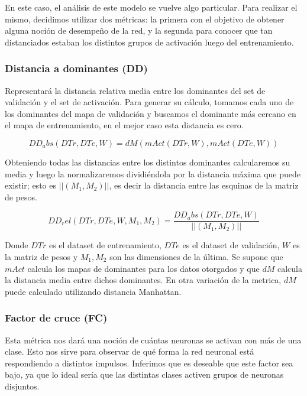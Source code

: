 \documentclass[informe.tex]{subfiles}
\begin{document}
      En este caso, el análisis de este modelo se vuelve algo particular. Para realizar el mismo, decidimos utilizar dos métricas: la primera con el objetivo de obtener alguna noción de desempe\~no de la red, y la segunda para conocer que tan distanciados estaban los distintos grupos de activación luego del entrenamiento.
      
      \subsubsection{Distancia a dominantes (DD)}
      
      Representar\'a la distancia relativa media entre los dominantes del set de validaci\'on y el set de activaci\'on. Para generar su cálculo, tomamos cada uno de los dominantes del mapa de validación y buscamos el dominante más cercano en el mapa de entrenamiento, en el mejor caso esta distancia es cero. 
      
      $$DD_abs(DTr, DTe, W) = dM(mAct(DTr,W), mAct(DTe,W))$$
      
      Obteniendo todas las distancias entre los distintos dominantes calcularemos su media y luego la normalizaremos dividiéndola por la distancia máxima que puede existir; esto es $||(M_1,M_2)||$, es decir la distancia entre las esquinas de la matriz de pesos.
      
      $$DD_rel(DTr, DTe, W, M_1, M_2) = \frac{DD_abs(DTr, DTe, W)}{||(M_1,M_2)||}$$
      
      Donde $DTr$ es el dataset de entrenamiento, $DTe$ es el dataset de validación, $W$ es la matriz de pesos y $M_1, M_2$  son las dimensiones de la última. Se supone que $mAct$ calcula los mapas de dominantes para los datos otorgados y que $dM$ calcula la distancia media entre dichos dominantes. En otra variaci\'on de la metrica, $dM$ puede calculado utilizando distancia Manhattan.
      
      \subsubsection{Factor de cruce (FC)}
      
      Esta métrica nos dará una noción de cuántas neuronas se activan con más de una clase. Esto nos sirve para observar de qué forma la red neuronal está respondiendo a distintos impulsos. Inferimos que es deseable que este factor sea bajo, ya que lo ideal sería que las distintas clases activen grupos de neuronas disjuntos.
      
      ~
      
\end{document}
